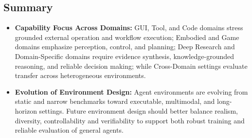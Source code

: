 \subsection{Summary}
\begin{tcolorbox}[takeaway,title={Takeaway 4}]
\begin{itemize}
    \item \textbf{Capability Focus Across Domains:} GUI, Tool, and Code domains stress grounded external operation and workflow execution; Embodied and Game domains emphasize perception, control, and planning; Deep Research and Domain-Specific domains require evidence synthesis, knowledge-grounded reasoning, and reliable decision making;
    while Cross-Domain settings evaluate transfer across heterogeneous environments.
    \item \textbf{Evolution of Environment Design:} Agent environments are evolving from static and narrow benchmarks toward executable, multimodal, and long-horizon settings. Future environment design should better balance realism, diversity, controllability and verifiability to support both robust training and reliable evaluation of general agents.
\end{itemize}
\end{tcolorbox}



